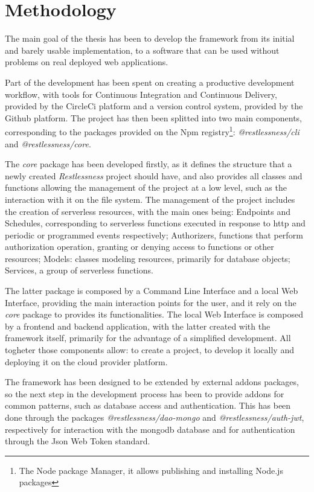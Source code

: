 \documentclass{article}
\begin{document}
\section{Methodology}
The main goal of the thesis has been to develop the framework from its initial and
barely usable implementation, to a software that can be used without problems on
real deployed web applications.

\noindent
Part of the development has been spent on creating a productive development
workflow, with tools for Continuous Integration and Continuous Delivery, provided
by the CircleCi platform and a version control system, provided by the Github
platform.
The project has then been splitted into two main components, corresponding to the
packages provided on the Npm registry\footnote{The Node package Manager, it allows
publishing and installing Node.js packages}: \mbox{\textit{@restlessness/cli}} and
\mbox{\textit{@restlessness/core}}.

\noindent
The \textit{core} package has been developed firstly, as it defines the structure
that a newly created \textit{Restlessness} project should have, and also provides
all classes and functions allowing the management of the project at a low level,
such as the interaction with it on the file system. The management of the project
includes the creation of serverless resources, with the main ones being: Endpoints
and Schedules, corresponding to serverless functions executed in response to http
and periodic or programmed events respectively; Authorizers, functions that perform
authorization operation, granting or denying access to functions or other resources;
Models: classes modeling resources, primarily for database objects; Services, a
group of serverless functions.

\noindent
The latter package is composed by a Command Line Interface and a local Web Interface,
providing the main interaction points for the user, and it rely on the \textit{core}
package to provides its functionalities. The local Web Interface is composed by
a frontend and backend application, with the latter created with the framework
itself, primarily for the advantage of a simplified development.
All togheter those components allow: to create a project, to develop it locally
and deploying it on the cloud provider platform.

\noindent
The framework has been designed to be extended by external addons packages, so the
next step in the development process has been to provide addons for common patterns,
such as database access and authentication. This has been done through the packages
\mbox{\textit{@restlessness/dao-mongo}} and \mbox{\textit{@restlessness/auth-jwt}},
respectively for interaction with the mongodb database and for authentication through
the Json Web Token standard.
\end{document}
